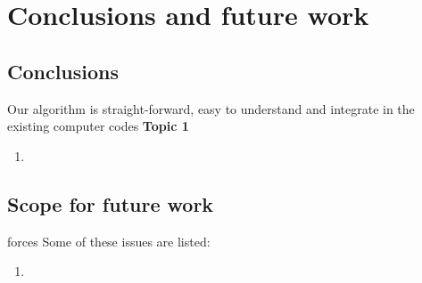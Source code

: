 \chapter{Conclusions and future work}
\label{Chapter6} %

\section{Conclusions}

Our algorithm is straight-forward, easy to understand and integrate in the existing computer codes
\textbf{Topic 1}

\begin{enumerate}
    \item \lipsum[2]
\end{enumerate}

\section{Scope for future work}
forces
Some of these issues are listed:
\begin{enumerate}
    \item \lipsum[4]
\end{enumerate}


